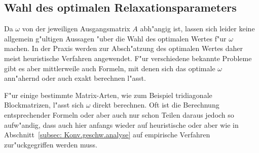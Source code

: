 \begin{refsection}
\section{Wahl des optimalen Relaxationsparameters}

Da $\omega$ von der jeweiligen Ausgangsmatrix $A$ abh"angig ist,
lassen sich leider keine allgemein g"ultigen Aussagen "uber die Wahl
des optimalen Wertes f"ur $\omega$ machen. In der Praxis werden zur Absch"atzung
des optimalen Wertes daher meist heuristische Verfahren angewendet.
F"ur verschiedene bekannte Probleme gibt es aber mittlerweile auch Formeln,
mit denen sich das optimale $\omega$ ann"ahernd oder auch exakt berechnen
l"asst.


F"ur einige bestimmte Matrix-Arten, wie zum Beispiel tridiagonale
Blockmatrizen, l"asst sich $\omega$ direkt berechnen. Oft ist die
Berechnung entsprechender Formeln oder aber auch nur schon Teilen daraus
jedoch so aufw"andig, dass auch hier anfangs wieder auf heuristische oder aber
wie in Abschnitt~\ref{subsec:
Konv.geschw.analyse} auf empirische Verfahren zur"uckgegriffen werden muss.


\end{refsection}
